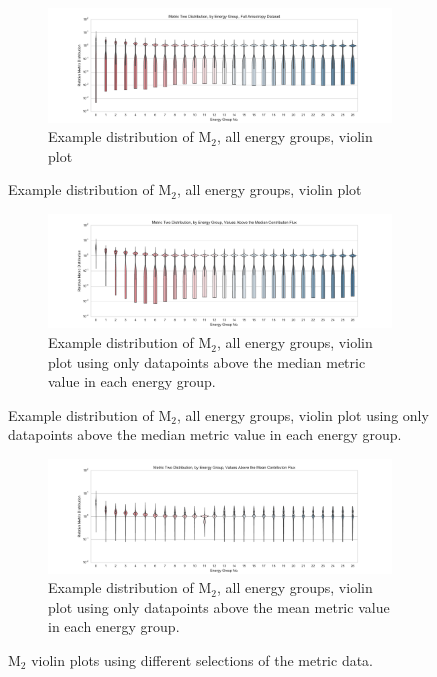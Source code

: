 \begin{figure}[htb!]
  \centering
  \begin{subfigure}[t]{\textwidth}
    \centering
    \includegraphics[width=\linewidth]{./chapters/characterization_probs/figures/sample_data/metric_two_violin_full.pdf}
    \caption{Example distribution of M$_2$, all energy groups, violin plot}
    \label{fig:samplefullviolinM2}
  \end{subfigure}
\end{figure}
\begin{figure}[htb!]\ContinuedFloat
  \centering
  \begin{subfigure}[t]{\textwidth}
    \centering
    \includegraphics[width=\linewidth]{./chapters/characterization_probs/figures/sample_data/metric_two_violin_median.pdf}
    \caption{Example distribution of M$_2$, all energy groups, violin plot using
    only datapoints above the median metric value in each energy group.}
    \label{fig:samplemedianviolinM2}
  \end{subfigure}
\end{figure}
\begin{figure}[htb!]\ContinuedFloat
  \centering
  \begin{subfigure}[t]{\textwidth}
    \centering
    \includegraphics[width=\linewidth]{./chapters/characterization_probs/figures/sample_data/metric_two_violin_mean.pdf}
    \caption{Example distribution of M$_2$, all energy groups, violin plot using
    only datapoints above the mean metric value in each energy group.}
    \label{fig:samplemeanviolinM2}
  \end{subfigure}
  \caption[M$_2$ violin plots using different selections of the metric data.]
  {M$_2$ violin plots using different selections of the metric data.}
  \label{fig:sampleviolinsM2}
\end{figure}

